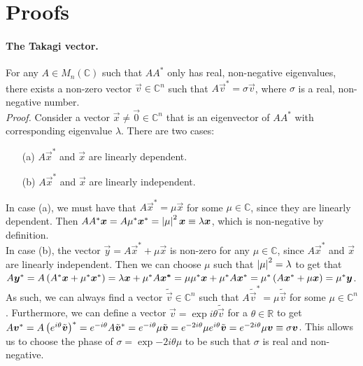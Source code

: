 \documentclass[english, notitlepage]{article}
\begin{document}
\section{Proofs}
    \paragraph{The Takagi vector.}
    For any \(A \in M_{n}(\mathbb{C})\) such that \(AA^\ast\) only has real, non-negative eigenvalues, there exists a non-zero vector \(\vec{v} \in \mathbb{C}^n\) such that \(A \vec{v}^* = \sigma \vec{v}\), where \(\sigma\) is a real, non-negative number.\\
    \emph{Proof.} Consider a vector \(\vec{x} \neq \vec{0} \in \mathbb{C}^n\) that is an eigenvector of \(AA^\ast\) with corresponding eigenvalue \(\lambda\).
    There are two cases:
    \begin{itemize}
        \item[(a)] \(A\vec{x}^*\) and \(\vec{x}\) are linearly dependent.
        \item[(b)] \(A\vec{x}^*\) and \(\vec{x}\) are linearly independent.
    \end{itemize}
    In case (a), we must have that \(A\vec{x}^* = \mu \vec{x}\) for some \(\mu \in \mathbb{C}\), since they are linearly dependent.
    Then \(AA^\ast \boldsymbol{x} = A \mu^\ast \boldsymbol{x}^* = \left|\mu\right|^2 \boldsymbol{x} \equiv \lambda \boldsymbol{x}\), which is non-negative by definition.\\
    In case (b), the vector \(\vec{y} = A\vec{x}^* + \mu \vec{x}\) is non-zero for any \(\mu \in \mathbb{C}\), since \(A\vec{x}^*\) and \(\vec{x}\) are linearly independent.
    Then we can choose \(\mu\) such that \(\left|\mu\right|^2 = \lambda\) to get that \(A \boldsymbol{y}^* = A\left(A^\ast \boldsymbol{x} + \mu^\ast \boldsymbol{x}^*\right) = \lambda\boldsymbol{x} + \mu^\ast A\boldsymbol{x^*} = \mu\mu^\ast \boldsymbol{x} + \mu^\ast A\boldsymbol{x}^* = \mu^\ast \left(A \boldsymbol{x}^* + \mu \boldsymbol{x}\right) = \mu^\ast \boldsymbol{y}\).\\
    As such, we can always find a vector \(\tilde{\vec{v}} \in \mathbb{C}^n\) such that \(A \tilde{\vec{v}}^* = \mu \tilde{\vec{v}}\) for some \(\mu \in \mathbb{C}^n\).
    Furthermore, we can define a vector \(\vec{v} = \exp{i\theta} \tilde{\vec{v}}\) for a \(\theta \in \mathbb{R}\) to get \(A\boldsymbol{v}^* = A \left(e^{i\theta} \tilde{\boldsymbol{v}}\right)^\ast = e^{-i\theta} A\tilde{\boldsymbol{v}}^* = e^{-i\theta} \mu \tilde{\boldsymbol{v}} = e^{-2i\theta} \mu e^{i\theta} \tilde{\boldsymbol{v}} = e^{-2i\theta} \mu \boldsymbol{v} \equiv \sigma \boldsymbol{v}\).
    This allows us to choose the phase of \(\sigma = \exp{-2i\theta} \mu\) to be such that \(\sigma\) is real and non-negative.
    \medskip
\end{document}
